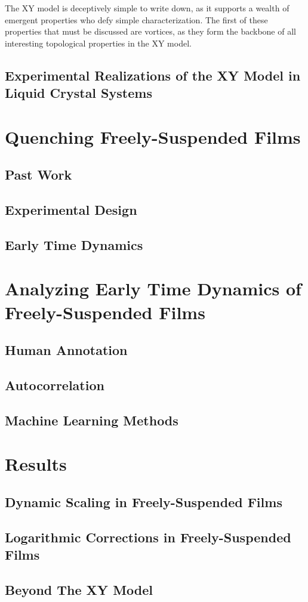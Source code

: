 \documentclass[aagreenthesis]{subfiles}
\begin{document}
The XY model is deceptively simple to write down, as it supports a wealth
of emergent properties who defy simple characterization. The first of these
properties that must be discussed are vortices, as they form the backbone
of all interesting topological properties in the XY model.




\subsection{Experimental Realizations of the XY Model in Liquid Crystal Systems}
\section{Quenching Freely-Suspended Films}
\subsection{Past Work}
\subsection{Experimental Design}
\subsection{Early Time Dynamics}

\section{Analyzing Early Time Dynamics of Freely-Suspended Films}
\subsection{Human Annotation}
\subsection{Autocorrelation}
\subsection{Machine Learning Methods}
\section{Results}
\subsection{Dynamic Scaling in Freely-Suspended Films}
\subsection{Logarithmic Corrections in Freely-Suspended Films}
\subsection{Beyond The XY Model}
\end{document}
